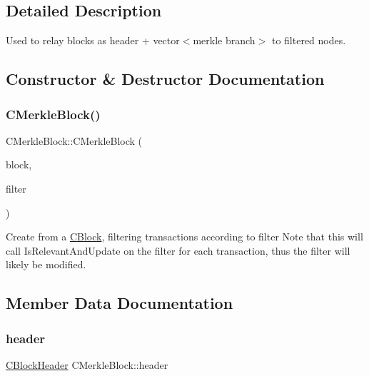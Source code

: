 \subsection{Detailed Description}
Used to relay blocks as header + vector$<$merkle branch$>$ to filtered nodes. 

\subsection{Constructor \& Destructor Documentation}
\mbox{\label{class_c_merkle_block_a5d08ce7034216ca25b0f9eab6bf8c389}} 
\subsubsection{\texorpdfstring{C\+Merkle\+Block()}{CMerkleBlock()}}
{\footnotesize\ttfamily C\+Merkle\+Block\+::\+C\+Merkle\+Block (\begin{DoxyParamCaption}\item[{const \mbox{\hyperlink{class_c_block}{C\+Block}} \&}]{block,  }\item[{\mbox{\hyperlink{class_c_bloom_filter}{C\+Bloom\+Filter}} \&}]{filter }\end{DoxyParamCaption})}

Create from a \mbox{\hyperlink{class_c_block}{C\+Block}}, filtering transactions according to filter Note that this will call Is\+Relevant\+And\+Update on the filter for each transaction, thus the filter will likely be modified. 

\subsection{Member Data Documentation}
\mbox{\label{class_c_merkle_block_a3c1fcef77eee1b476b3f3fd52055748a}} 
\subsubsection{\texorpdfstring{header}{header}}
{\footnotesize\ttfamily \mbox{\hyperlink{class_c_block_header}{C\+Block\+Header}} C\+Merkle\+Block\+::header}

